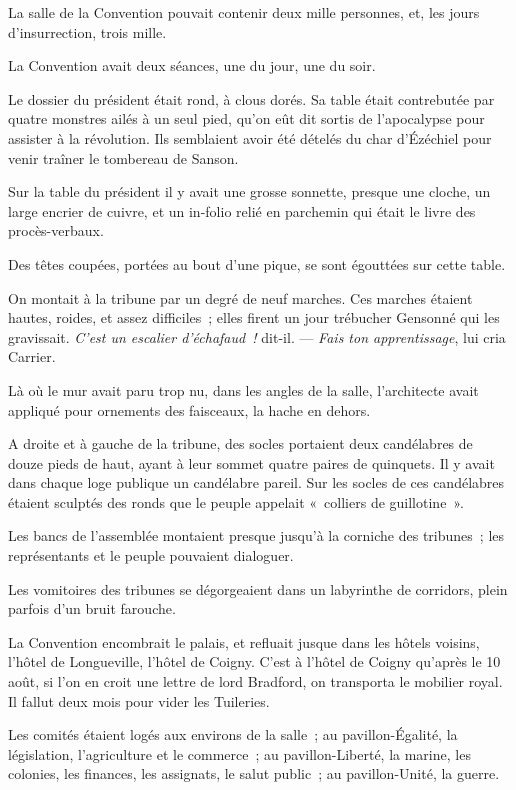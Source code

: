 \documentclass[french,twoside]{book} %
\begin{document}
La salle de la Convention pouvait contenir deux mille personnes, et, les jours d’insurrection, trois mille.\par
La Convention avait deux séances, une du jour, une du soir.\par
Le dossier du président était rond, à clous dorés. Sa table était contrebutée par quatre monstres ailés à un seul pied, qu’on eût dit sortis de l’apocalypse pour assister à la révolution. Ils semblaient avoir été dételés du char d’Ézéchiel pour venir traîner le tombereau de Sanson.\par
Sur la table du président il y avait une grosse sonnette, presque une cloche, un large encrier de cuivre, et un in-folio relié en parchemin qui était le livre des procès-verbaux.\par
Des têtes coupées, portées au bout d’une pique, se sont égouttées sur cette table.\par
On montait à la tribune par un degré de neuf marches. Ces marches étaient hautes, roides, et assez difficiles ; elles firent un jour trébucher Gensonné qui les gravissait. \emph{C’est un escalier d’échafaud !} dit-il. — \emph{Fais ton apprentissage}, lui cria Carrier.\par
 Là où le mur avait paru trop nu, dans les angles de la salle, l’architecte avait appliqué pour ornements des faisceaux, la hache en dehors.\par
A droite et à gauche de la tribune, des socles portaient deux candélabres de douze pieds de haut, ayant à leur sommet quatre paires de quinquets. Il y avait dans chaque loge publique un candélabre pareil. Sur les socles de ces candélabres étaient sculptés des ronds que le peuple appelait « colliers de guillotine ».\par
Les bancs de l’assemblée montaient presque jusqu’à la corniche des tribunes ; les représentants et le peuple pouvaient dialoguer.\par
Les vomitoires des tribunes se dégorgeaient dans un labyrinthe de corridors, plein parfois d’un bruit farouche.\par
La Convention encombrait le palais, et refluait jusque dans les hôtels voisins, l’hôtel de Longueville, l’hôtel de Coigny. C’est à l’hôtel de Coigny qu’après le 10 août, si l’on en croit une lettre de lord Bradford, on transporta le mobilier royal. Il fallut deux mois pour vider les Tuileries.\par
Les comités étaient logés aux environs de la salle ; au pavillon-Égalité, la législation, l’agriculture et le commerce ; au pavillon-Liberté, la marine, les colonies, les finances, les assignats, le salut public ; au pavillon-Unité, la guerre.\par
\end{document}
